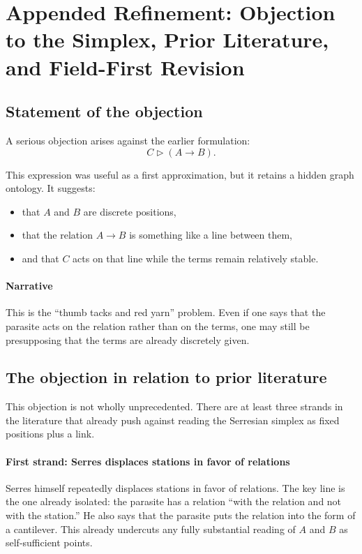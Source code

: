 
\section{Appended Refinement: Objection to the Simplex, Prior Literature, and Field-First Revision}

\subsection*{Statement of the objection}

A serious objection arises against the earlier formulation:
\[
C \triangleright (A \to B).
\]

This expression was useful as a first approximation, but it retains a hidden
graph ontology. It suggests:
\begin{itemize}
\item that \(A\) and \(B\) are discrete positions,
\item that the relation \(A \to B\) is something like a line between them,
\item and that \(C\) acts on that line while the terms remain relatively stable.
\end{itemize}

\paragraph{Narrative}
This is the ``thumb tacks and red yarn'' problem.
Even if one says that the parasite acts on the relation rather than on the terms,
one may still be presupposing that the terms are already discretely given.

\subsection*{The objection in relation to prior literature}

This objection is not wholly unprecedented. There are at least three strands in the
literature that already push against reading the Serresian simplex as fixed positions plus a link.

\paragraph{First strand: Serres displaces stations in favor of relations}
Serres himself repeatedly displaces stations in favor of relations.
The key line is the one already isolated:
the parasite has a relation ``with the relation and not with the station.''
He also says that the parasite puts the relation into the form of a cantilever.
This already undercuts any fully substantial reading of \(A\) and \(B\) as self-sufficient points.

